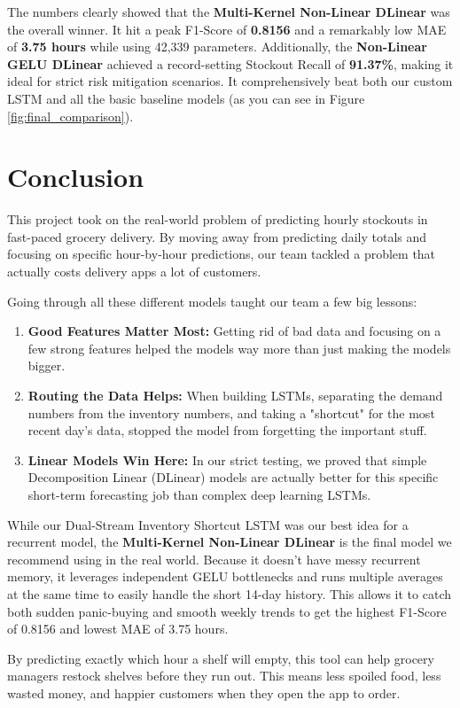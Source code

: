 The numbers clearly showed that the \textbf{Multi-Kernel Non-Linear DLinear} was the overall winner. It hit a peak F1-Score of \textbf{0.8156} and a remarkably low MAE of \textbf{3.75 hours} while using 42,339 parameters. Additionally, the \textbf{Non-Linear GELU DLinear} achieved a record-setting Stockout Recall of \textbf{91.37\%}, making it ideal for strict risk mitigation scenarios. It comprehensively beat both our custom LSTM and all the basic baseline models (as you can see in Figure \ref{fig:final_comparison}). 



\section{Conclusion}

This project took on the real-world problem of predicting hourly stockouts in fast-paced grocery delivery. By moving away from predicting daily totals and focusing on specific hour-by-hour predictions, our team tackled a problem that actually costs delivery apps a lot of customers.

Going through all these different models taught our team a few big lessons:

\begin{enumerate}
    \item \textbf{Good Features Matter Most:} Getting rid of bad data and focusing on a few strong features helped the models way more than just making the models bigger.
    \item \textbf{Routing the Data Helps:} When building LSTMs, separating the demand numbers from the inventory numbers, and taking a "shortcut" for the most recent day's data, stopped the model from forgetting the important stuff.
    \item \textbf{Linear Models Win Here:} In our strict testing, we proved that simple Decomposition Linear (DLinear) models are actually better for this specific short-term forecasting job than complex deep learning LSTMs.
\end{enumerate}

While our Dual-Stream Inventory Shortcut LSTM was our best idea for a recurrent model, the \textbf{Multi-Kernel Non-Linear DLinear} is the final model we recommend using in the real world. Because it doesn't have messy recurrent memory, it leverages independent GELU bottlenecks and runs multiple averages at the same time to easily handle the short 14-day history. This allows it to catch both sudden panic-buying and smooth weekly trends to get the highest F1-Score of 0.8156 and lowest MAE of 3.75 hours. 

By predicting exactly which hour a shelf will empty, this tool can help grocery managers restock shelves before they run out. This means less spoiled food, less wasted money, and happier customers when they open the app to order.
